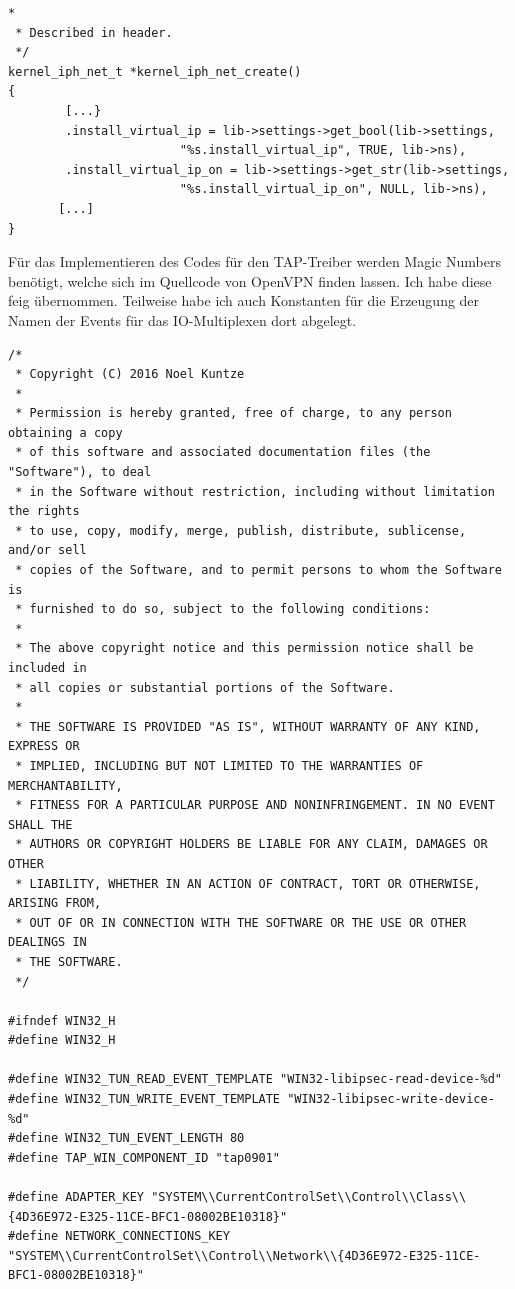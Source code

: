 \begin{lstlisting}[caption=Ergänzung zu kernel\_iph\_net\_create()]
*
 * Described in header.
 */
kernel_iph_net_t *kernel_iph_net_create()
{
        [...}
		.install_virtual_ip = lib->settings->get_bool(lib->settings,
						"%s.install_virtual_ip", TRUE, lib->ns),
		.install_virtual_ip_on = lib->settings->get_str(lib->settings,
						"%s.install_virtual_ip_on", NULL, lib->ns),
	   [...]
}
\end{lstlisting}

Für das Implementieren des Codes für den TAP-Treiber werden Magic Numbers benötigt,
welche sich im Quellcode von OpenVPN finden lassen. Ich habe diese feig übernommen.
Teilweise habe ich auch Konstanten für die Erzeugung der Namen der Events für
das IO-Multiplexen dort abgelegt.
\begin{lstlisting}[caption=Code von win32.h]
/*
 * Copyright (C) 2016 Noel Kuntze
 *
 * Permission is hereby granted, free of charge, to any person obtaining a copy
 * of this software and associated documentation files (the "Software"), to deal
 * in the Software without restriction, including without limitation the rights
 * to use, copy, modify, merge, publish, distribute, sublicense, and/or sell
 * copies of the Software, and to permit persons to whom the Software is
 * furnished to do so, subject to the following conditions:
 *
 * The above copyright notice and this permission notice shall be included in
 * all copies or substantial portions of the Software.
 *
 * THE SOFTWARE IS PROVIDED "AS IS", WITHOUT WARRANTY OF ANY KIND, EXPRESS OR
 * IMPLIED, INCLUDING BUT NOT LIMITED TO THE WARRANTIES OF MERCHANTABILITY,
 * FITNESS FOR A PARTICULAR PURPOSE AND NONINFRINGEMENT. IN NO EVENT SHALL THE
 * AUTHORS OR COPYRIGHT HOLDERS BE LIABLE FOR ANY CLAIM, DAMAGES OR OTHER
 * LIABILITY, WHETHER IN AN ACTION OF CONTRACT, TORT OR OTHERWISE, ARISING FROM,
 * OUT OF OR IN CONNECTION WITH THE SOFTWARE OR THE USE OR OTHER DEALINGS IN
 * THE SOFTWARE.
 */

#ifndef WIN32_H
#define WIN32_H

#define WIN32_TUN_READ_EVENT_TEMPLATE "WIN32-libipsec-read-device-%d"
#define WIN32_TUN_WRITE_EVENT_TEMPLATE "WIN32-libipsec-write-device-%d"
#define WIN32_TUN_EVENT_LENGTH 80
#define TAP_WIN_COMPONENT_ID "tap0901"

#define ADAPTER_KEY "SYSTEM\\CurrentControlSet\\Control\\Class\\{4D36E972-E325-11CE-BFC1-08002BE10318}"
#define NETWORK_CONNECTIONS_KEY "SYSTEM\\CurrentControlSet\\Control\\Network\\{4D36E972-E325-11CE-BFC1-08002BE10318}"


\end{lstlisting}
